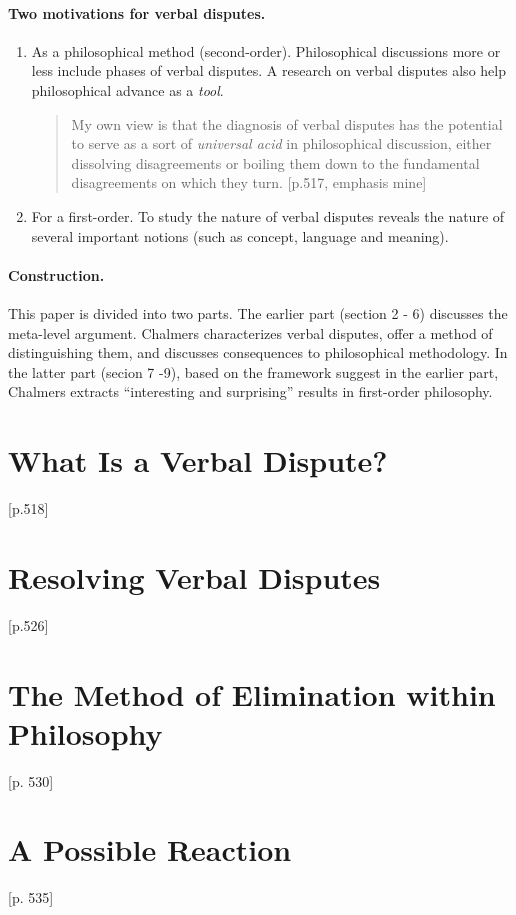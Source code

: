 \documentclass[
10pt, %
a4paper, %
twocolumn, %
landscape %
]{article}
\begin{document}
\paragraph{Two motivations for verbal disputes.}
\begin{enumerate}
  \item As a philosophical method (second-order). Philosophical discussions more or less include phases of verbal disputes. A research on verbal disputes also help philosophical advance as a \emph{tool}.
  \begin{quote}
      My own view is that the diagnosis of verbal disputes has the potential to serve as a sort of \emph{universal acid} in philosophical discussion, either dissolving disagreements or boiling them down to the fundamental disagreements on which they turn. [p.517, emphasis mine]
  \end{quote}

  \item For a first-order. To study the nature of verbal disputes reveals the nature of several important notions (such as concept, language and meaning).
\end{enumerate}

\paragraph{Construction.}
This paper is divided into two parts.
The earlier part (section 2 - 6) discusses the meta-level argument. Chalmers characterizes verbal disputes, offer a method of distinguishing them, and discusses consequences to philosophical methodology.
In the latter part (secion 7 -9), based on the framework suggest in the earlier part, Chalmers extracts ``interesting and surprising'' results in first-order philosophy.

\section{What Is a Verbal Dispute?}
[p.518]
\section{Resolving Verbal Disputes}
[p.526]
\section{The Method of Elimination within Philosophy}
[p. 530]
\section{A Possible Reaction}
[p. 535]
\end{document}

